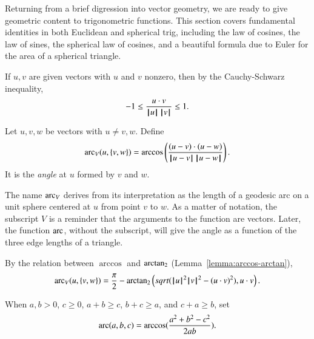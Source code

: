 Returning from a brief digression into vector geometry, we
are ready to give geometric content to trigonometric functions.
This section covers fundamental identities
in both Euclidean and spherical trig, including the law
of cosines, the law of sines, the spherical law of cosines, 
and a beautiful formula due to Euler for
the area of a spherical triangle.

If $u,v$ are given vectors with $u$ and $v$ nonzero, then by the
Cauchy-Schwarz inequality,
    $$-1 \le \frac{u\cdot v}{{{\hskip0.1em|\hskip-0.15em|\hskip0.1em}u{\hskip0.1em|\hskip-0.15em|\hskip0.1em}}\,{{\hskip0.1em|\hskip-0.15em|\hskip0.1em}v{\hskip0.1em|\hskip-0.15em|\hskip0.1em}}} \le 1.$$

\begin{definition}\label{def:angle}
Let $u,v,w$ be vectors with $u\ne v,w$.
Define
    $$
    \operatorname{arc}_V(u,\{v,w\}) = \arccos\left(\frac{(u-v)\cdot (u-w)}{{\hskip0.1em|\hskip-0.15em|\hskip0.1em}u - v{\hskip0.1em|\hskip-0.15em|\hskip0.1em}\,{\hskip0.1em|\hskip-0.15em|\hskip0.1em}u - w{\hskip0.1em|\hskip-0.15em|\hskip0.1em}}\right).
    $$
It is the {\it angle} at $u$ formed by $v$ and $w$.
\end{definition}

The name $\operatorname{arc}_V$ derives from its interpretation as the
length of a geodesic arc on a unit sphere
centered at $u$ from point $v$ to $w$.
As a matter of notation, the subscript $V$ is a reminder that
the arguments to the function are vectors.  Later, the function
$\operatorname{arc}$, without the subscript, will give the angle as a function
of the three edge lengths of a triangle.




By the relation between $\arccos$ and ${\operatorname{arctan_2}}$
(Lemma~\ref{lemma:arccos-arctan}), %
    \begin{equation}\label{eqn:angle}
    \operatorname{arc}_V(u,\{v,w\}) = \frac{\pi}2 - {\operatorname{arctan_2}}\left ({sqrt{({{\hskip0.1em|\hskip-0.15em|\hskip0.1em}u{\hskip0.1em|\hskip-0.15em|\hskip0.1em}}^2{{\hskip0.1em|\hskip-0.15em|\hskip0.1em}v{\hskip0.1em|\hskip-0.15em|\hskip0.1em}}^2 -
    (u\cdot v)^2)}}, {u\cdot v}\right).
    \end{equation}

\begin{definition}[arc]
When $a,b>0$, $c\ge0$,  $a + b \ge c$, $b + c \ge a$, 
and $c+a \ge b$, set 
 $$\operatorname{arc}(a,b,c) = \arccos(\frac{a^2 + b^2 - c^2}{2 a b}).$$
\end{definition}


